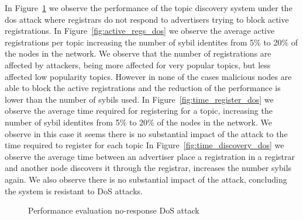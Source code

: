 In Figure~\ref{fig:perf_dos} we observe the performance of the topic discovery system under the dos attack where registrars do not respond to advertisers trying to block active registrations.
In Figure~\ref{fig:active_regs_dos} we observe the average active registrations per topic increasing the number of sybil identites from 5\% to 20\% of the nodes in the network.
We observe that the number of registrations are affected by attackers,  being more affected for very popular topics,  but less affected low popularity topics.  However in none of the cases malicious nodes are able to block the active registrations and the reduction of the performance is lower than the number of sybils used.
In Figure~\ref{fig:time_register_dos} we observe the average time required for registering for a topic,  increasing the number of sybil identites from 5\% to 20\% of the nodes in the network.
We observe in this case it seems there is no substantial impact of the attack to the time required to register for each topic
In Figure~\ref{fig:time_discovery_dos} we observe the average time between an advertiser place a registration in a registrar and another node discovers it through the registrar,  increases the number sybils again.
We also observe there is no substantial impact of the attack, concluding the system is resistant to DoS attacks.

\begin{figure}[!h]
\centering
{} 
\hspace{-0.16cm}
\label{fig:discovery_dos}
\hspace{-0.15in}
\label{fig:perf_dos}
\caption{Performance evaluation no-response DoS attack} 
\vspace{-0.15in}
\end{figure}   


%
